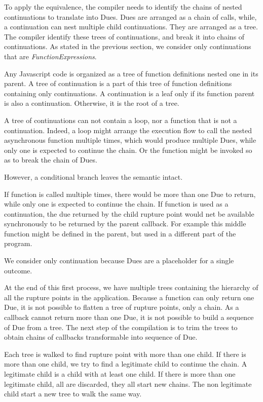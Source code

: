 To apply the equivalence, the compiler needs to identify the chains of nested continuations to translate into Dues.
Dues are arranged as a chain of calls, while, a continuation can nest multiple child continuations.
They are arranged as a tree.
The compiler identify these trees of continuations, and break it into chains of continuations.
As stated in the previous section, we consider only continuations that are \textit{FunctionExpressions}.

Any Javascript code is organized as a tree of function definitions nested one in its parent.
A tree of continuation is a part of this tree of function definitions containing only continuations.
A continuation is a leaf only if its function parent is also a continuation.
Otherwise, it is the root of a tree.

A tree of continuations can not contain a loop, nor a function that is not a continuation.
Indeed, a loop might arrange the execution flow to call the nested asynchronous function multiple times, which would produce multiple Dues, while only one is expected to continue the chain.
Or the function might be invoked so as to break the chain of Dues.


However, a conditional branch leaves the semantic intact.

If function is called multiple times, there would be more than one Due to return, while only one is expected to continue the chain.
If function is used as a continuation, the due returned by the child rupture point would net be available synchronously to be returned by the parent callback.
For example this middle function might be defined in the parent, but used in a different part of the program.


We consider only continuation because Dues are a placeholder for a single outcome.


At the end of this first process, we have multiple trees containing the hierarchy of all the rupture points in the application.
Because a function can only return one Due, it is not possible to flatten a tree of rupture points, only a chain.
As a callback cannot return more than one Due, it is not possible to build a sequence of Due from a tree.
The next step of the compilation is to trim the trees to obtain chains of callbacks transformable into sequence of Due.

Each tree is walked to find rupture point with more than one child.
If there is more than one child, we try to find a legitimate child to continue the chain.
A legitimate child is a child with at least one child.
If there is more than one legitimate child, all are discarded, they all start new chains.
The non legitimate child start a new tree to walk the same way.

